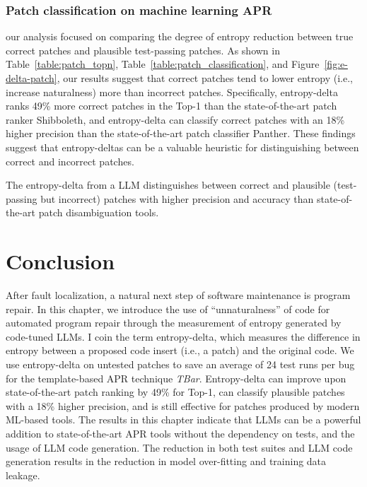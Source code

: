 \documentclass[12pt,openany,oneside,table]{cmuthesis}
\begin{document}
\subsubsection{Patch classification on machine learning APR}
our analysis focused on comparing the degree of entropy reduction between true
correct patches and plausible test-passing patches. As shown in
Table~\ref{table:patch_topn}, Table~\ref{table:patch_classification}, and
Figure~\ref{fig:e-delta-patch}, our results suggest that correct patches
tend to lower entropy (i.e., increase naturalness) more than incorrect patches. 
Specifically, entropy-delta ranks 49\% more correct patches in the Top-1
than the state-of-the-art patch ranker Shibboleth, and entropy-delta can
classify correct patches with an 18\% higher precision than the state-of-the-art
patch classifier Panther. These findings suggest that entropy-deltas can be a
valuable heuristic for distinguishing between correct and incorrect patches.


\begin{tcolorbox}
  [colback=white,colframe=black,arc=0pt,boxrule=0.5pt,title=RQ2
    Summary,boxsep=2pt,left=1pt,right=1pt,top=1pt,bottom=1pt,fonttitle=\bfseries]
    The entropy-delta from a LLM distinguishes between correct and plausible
    (test-passing but incorrect) patches with
    higher precision and accuracy than state-of-the-art patch disambiguation tools.
\end{tcolorbox}


\section{Conclusion}
\label{sec:Entropy-conclusion}
After fault localization, a natural next step of software maintenance is program repair. 
In this chapter, we introduce the use of ``unnaturalness'' of code for automated
program repair through the measurement of entropy generated by code-tuned LLMs.
I coin the term entropy-delta, which measures the difference in
entropy between a proposed code insert (i.e., a patch) and the original code. We use entropy-delta on untested patches to save an average of 24
test runs per bug for the template-based APR technique \textit{TBar}. Entropy-delta can improve upon state-of-the-art patch ranking by 49\% for Top-1,
can classify plausible patches with a 18\% higher precision, and is still effective  for patches produced by modern ML-based tools. The results in this chapter
indicate that LLMs can be a powerful addition to state-of-the-art APR tools
without the dependency on tests, and the usage of LLM code generation. The
reduction in both test suites and LLM code generation results in the reduction
in model over-fitting and training data leakage.
\end{document}
